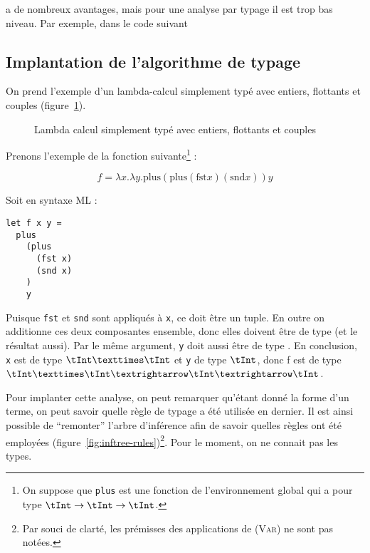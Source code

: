 \newspeak{} a de nombreux avantages, mais pour une analyse par typage il est
trop bas niveau. Par exemple, dans le code suivant



\wip{}

\subsection{Implantation de l'algorithme de typage}

On prend l'exemple d'un lambda-calcul simplement typé avec entiers, flottants et
couples (figure~\ref{fig:stlc}).

\begin{figure}



\caption{Lambda calcul simplement typé avec entiers, flottants et couples}
\label{fig:stlc}

\end{figure}

Prenons l'exemple de la fonction suivante\footnote{ On suppose que \texttt{plus}
est une fonction de l'environnement global qui a pour type $\tInt \rightarrow
\tInt \rightarrow \tInt$.} :

\[
f = λx.λy. \textrm{plus} (\textrm{plus} (\textrm{fst} x) (\textrm{snd} x)) y
\]

Soit en syntaxe ML :

\begin{Verbatim}
let f x y =
  plus
    (plus
      (fst x)
      (snd x)
    )
    y
\end{Verbatim}

Puisque \texttt{fst} et \texttt{snd} sont appliqués à \texttt{x}, ce doit être
un tuple. En outre on additionne ces deux composantes ensemble, donc elles
doivent être de type \tInt (et le résultat aussi). Par le même argument,
\texttt{y} doit aussi être de type \tInt. En conclusion, \texttt{x} est de type
$\tInt × \tInt$ et \texttt{y} de type $\tInt$, donc f est de type $\tInt × \tInt
→ \tInt → \tInt$.

Pour implanter cette analyse, on peut remarquer qu'étant donné la forme d'un
terme, on peut savoir quelle règle de typage a été utilisée en dernier. Il est
ainsi possible de ``remonter'' l'arbre d'inférence afin de savoir quelles règles
ont été employées (figure~\ref{fig:inftree-rules})\footnote{Par souci de clarté,
les prémisses des applications de \textsc{(Var)} ne sont pas notées.}. Pour le
moment, on ne connait pas les types.

